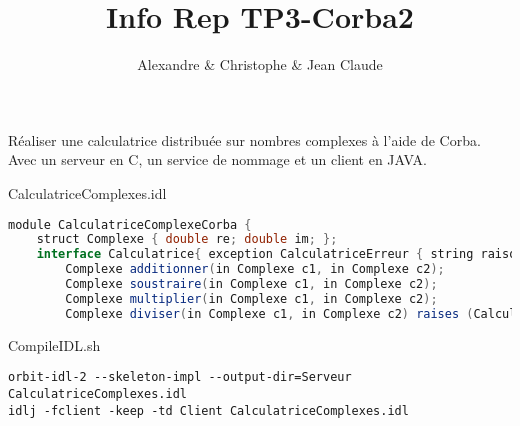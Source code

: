 \documentclass{article}
\title{\vspace{-5ex}Info Rep TP3-Corba2\vspace{-2ex}}
\author{Alexandre \bsc{Brehmer} \& Christophe \bsc{Cluizel}\& Jean Claude \bsc{Bernard}\vspace{-2ex}}
\begin{document}
\maketitle
\vspace{-6ex}
Réaliser une calculatrice distribuée sur nombres complexes à l'aide de Corba. Avec un serveur en C, un service de nommage et un client en JAVA.


CalculatriceComplexes.idl
\vspace{-1.5ex}
\begin{lstlisting}[language=JAVA]
module CalculatriceComplexeCorba {
 	struct Complexe { double re; double im; };
	interface Calculatrice{ exception CalculatriceErreur { string raison;  };
		Complexe additionner(in Complexe c1, in Complexe c2);
		Complexe soustraire(in Complexe c1, in Complexe c2);
		Complexe multiplier(in Complexe c1, in Complexe c2);
		Complexe diviser(in Complexe c1, in Complexe c2) raises (CalculatriceErreur);	}; };
\end{lstlisting}


\vspace{-1ex}
CompileIDL.sh
\vspace{-1.5ex}
\begin{lstlisting}
orbit-idl-2 --skeleton-impl --output-dir=Serveur CalculatriceComplexes.idl
idlj -fclient -keep -td Client CalculatriceComplexes.idl
\end{lstlisting}
\end{document}
